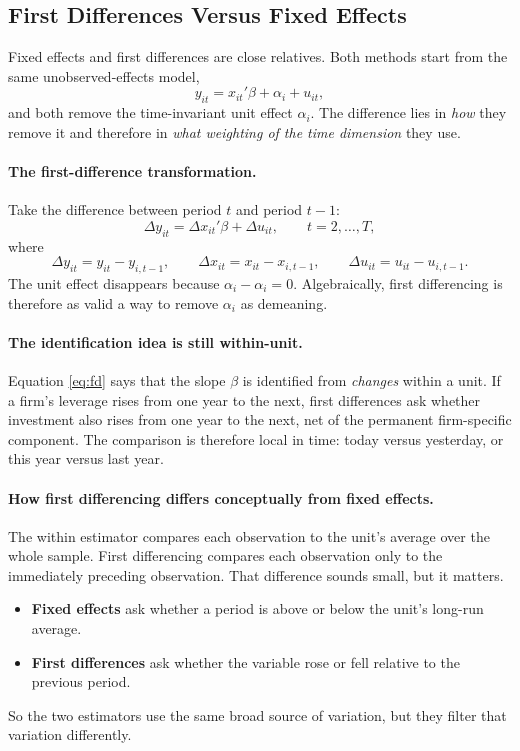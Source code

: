 \subsection{First Differences Versus Fixed Effects}
Fixed effects and first differences are close relatives. Both methods start from the same unobserved-effects model,
\begin{equation}
y_{it} = x_{it}'\beta + \alpha_i + u_{it},
\label{eq:fdfe_base}
\end{equation}
and both remove the time-invariant unit effect $\alpha_i$. The difference lies in \emph{how} they remove it and therefore in \emph{what weighting of the time dimension} they use.

\paragraph{The first-difference transformation.}
Take the difference between period $t$ and period $t-1$:
\begin{equation}
\Delta y_{it} = \Delta x_{it}'\beta + \Delta u_{it},
\qquad t=2,\dots,T,
\label{eq:fd}
\end{equation}
where
\[
\Delta y_{it}=y_{it}-y_{i,t-1},
\qquad
\Delta x_{it}=x_{it}-x_{i,t-1},
\qquad
\Delta u_{it}=u_{it}-u_{i,t-1}.
\]
The unit effect disappears because $\alpha_i-\alpha_i=0$. Algebraically, first differencing is therefore as valid a way to remove $\alpha_i$ as demeaning.

\paragraph{The identification idea is still within-unit.}
Equation \eqref{eq:fd} says that the slope $\beta$ is identified from \emph{changes} within a unit. If a firm's leverage rises from one year to the next, first differences ask whether investment also rises from one year to the next, net of the permanent firm-specific component. The comparison is therefore local in time: today versus yesterday, or this year versus last year.

\paragraph{How first differencing differs conceptually from fixed effects.}
The within estimator compares each observation to the unit's average over the whole sample. First differencing compares each observation only to the immediately preceding observation. That difference sounds small, but it matters.
\begin{itemize}
\item \textbf{Fixed effects} ask whether a period is above or below the unit's long-run average.
\item \textbf{First differences} ask whether the variable rose or fell relative to the previous period.
\end{itemize}
So the two estimators use the same broad source of variation, but they filter that variation differently.

